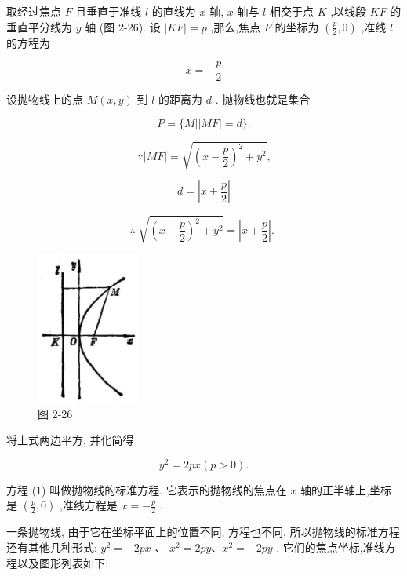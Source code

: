 \documentclass[lang=cn,newtx,10pt,scheme=chinese]{elegantbook}
\begin{document}
取经过焦点 \(F\) 且垂直于准线 \(l\) 的直线为 \(x\) 轴, \(x\) 轴与 \(l\) 相交于点 \(K\) ,以线段 \({KF}\) 的垂直平分线为 \(y\) 轴 (图 2-26). 设 \(\left| {KF}\right| = p\) ,那么,焦点 \(F\) 的坐标为 \(\left( {\frac{p}{2},0}\right)\) ,准线 \(l\) 的方程为

\[
  x = - \frac{p}{2}
\]

设抛物线上的点 \(M\left( {x,y}\right)\) 到 \(l\) 的距离为 \(d\) . 抛物线也就是集合

\[
  P = \{ M\left| \right| {MF} \mid = d\} .
\]

\[
  \because \left| {MF}\right| = \sqrt{{\left( x - \frac{p}{2}\right) }^{2} + {y}^{2}}\text{,}
\]

\[
  d = \left| {x + \frac{p}{2}}\right|
\]

\[
  \therefore \;\sqrt{{\left( x - \frac{p}{2}\right) }^{2} + {y}^{2}} = \left| {x + \frac{p}{2}}\right| \text{. }
\]

\begin{figure}[h]
  \centering
  \includegraphics[max width=0.3\textwidth]{images/01912cc2-ffb6-728e-9ae7-b113ff05c64b_109_844881.jpg}
  \caption{图 2-26}
\end{figure}



将上式两边平方, 并化简得

\[
    {y}^{2} = {2px}\left( {p > 0}\right) \text{.} \tag{1}
\]

方程 (1) 叫做抛物线的标准方程. 它表示的抛物线的焦点在 \(x\) 轴的正半轴上,坐标是 \(\left( {\frac{p}{2},0}\right)\) ,准线方程是 \(x = - \frac{p}{2}\) .

一条抛物线, 由于它在坐标平面上的位置不同, 方程也不同. 所以抛物线的标准方程还有其他几种形式: \({y}^{2} = - {2px}\) 、 \({x}^{2} = {2py}\text{、}{x}^{2} = - {2py}\) . 它们的焦点坐标,准线方程以及图形列表如下:
\end{document}
